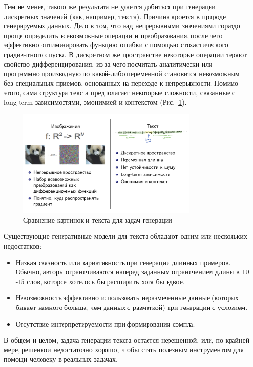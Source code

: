 \documentclass{spbau-diploma}
\begin{document}
Тем не менее, такого же результата не удается добиться при генерации дискретных 
значений (как, например, текста). Причина кроется в природе 
генерируемых данных. Дело в том, что над непрерывными значениями гораздо проще 
определить всевозможные операции и преобразования, после чего эффективно 
оптимизировать функцию ошибки с помощью стохастического градиентного спуска. В 
дискретном же пространстве некоторые операции теряют свойство дифференцирования, 
из-за чего посчитать аналитически или программно производную по какой-либо 
переменной становится невозможным без специальных приемов, основанных на 
переходе к непрерывности. Помимо этого, сама структура текста 
предполагает некоторые сложности, связанные с long-term зависимостями, омонимией 
и контекстом (Рис.~\ref{pics_vs_text}).

\begin{figure}[H]
\centering
\includegraphics[width=0.8\textwidth]{images/pics_vs_text.png}
\caption{Сравнение картинок и текста для задач генерации}
\label{pics_vs_text}
\end{figure}

Существующие генеративные модели для текста обладают одним или нескольких 
недостатков:
\begin{itemize}
    \item Низкая связность или вариативность при генерации длинных примеров. Обычно, авторы ограничиваются наперед заданным ограничением длины в $10$-$15$ слов, которое хотелось бы расширить хотя бы вдвое.
    \item Невозможность эффективно использовать неразмеченные данные (которых бывает намного больше, чем данных с разметкой) при генерации с условием.
    \item Отсутствие интерпретируемости при формировании сэмпла.
\end{itemize}
В общем и целом, задача генерации текста остается нерешенной, или, по крайней
мере, решенной недостаточно хорошо, чтобы стать полезным инструментом для 
помощи человеку в реальных задачах.
\end{document}
